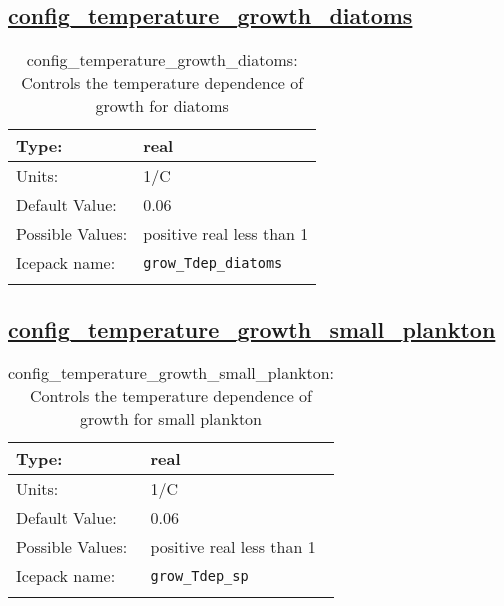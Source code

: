 \subsection[config\_temperature\_growth\_diatoms]{\hyperref[sec:nm_tab_biogeochemistry]{config\_temperature\_growth\_diatoms}}
\label{subsec:nm_sec_config_temperature_growth_diatoms}
\begin{center}
\begin{longtable}{| p{2.0in} || p{4.0in} |}
    \hline
    Type: & real \\
    \hline
    Units: & \si{1/C} \\
    \hline
    Default Value: & 0.06 \\
    \hline
    Possible Values: & positive real less than 1 \\
    \hline
    Icepack name: & \verb+grow_Tdep_diatoms+ \\
    \hline
    \caption{config\_temperature\_growth\_diatoms: Controls the temperature dependence of growth for diatoms}
\end{longtable}
\end{center}
\subsection[config\_temperature\_growth\_small\_plankton]{\hyperref[sec:nm_tab_biogeochemistry]{config\_temperature\_growth\_small\_plankton}}
\label{subsec:nm_sec_config_temperature_growth_small_plankton}
\begin{center}
\begin{longtable}{| p{2.0in} || p{4.0in} |}
    \hline
    Type: & real \\
    \hline
    Units: & \si{1/C} \\
    \hline
    Default Value: & 0.06 \\
    \hline
    Possible Values: & positive real less than 1 \\
    \hline
    Icepack name: & \verb+grow_Tdep_sp+ \\
    \hline
    \caption{config\_temperature\_growth\_small\_plankton: Controls the temperature dependence of growth for small plankton}
\end{longtable}
\end{center}
